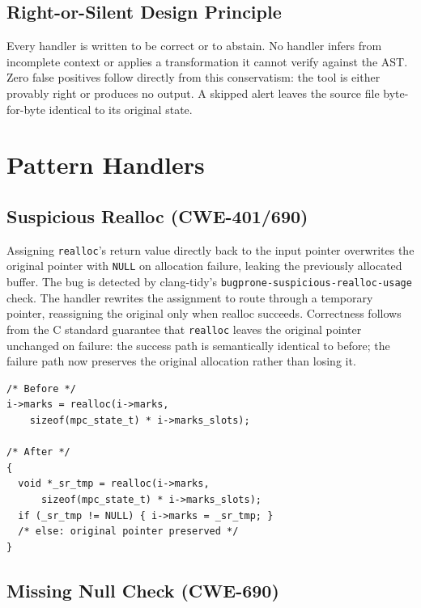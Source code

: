 \documentclass[conference]{IEEEtran}
\begin{document}
\subsection{Right-or-Silent Design Principle}
Every handler is written to be correct or to abstain. No handler infers from
incomplete context or applies a transformation it cannot verify against the AST.
Zero false positives follow directly from this conservatism: the tool is either
provably right or produces no output. A skipped alert leaves the source
file byte-for-byte identical to its original state.


\section{Pattern Handlers}
\label{sec:handlers}

\subsection{Suspicious Realloc (CWE-401/690)}

Assigning \texttt{realloc}'s return value directly back to the input pointer
overwrites the original pointer with \texttt{NULL} on allocation failure, leaking
the previously allocated buffer. The bug is detected by clang-tidy's
\texttt{bugprone-suspicious-realloc-usage} check. The handler rewrites the
assignment to route through a temporary pointer, reassigning the original only
when realloc succeeds. Correctness follows from the C standard guarantee that
\texttt{realloc} leaves the original pointer unchanged on failure: the success
path is semantically identical to before; the failure path now preserves the
original allocation rather than losing it.

\begin{lstlisting}[caption={CWE-401/690 fix: mpc.c (orangeduck/mpc)}]
/* Before */
i->marks = realloc(i->marks,
    sizeof(mpc_state_t) * i->marks_slots);

/* After */
{
  void *_sr_tmp = realloc(i->marks,
      sizeof(mpc_state_t) * i->marks_slots);
  if (_sr_tmp != NULL) { i->marks = _sr_tmp; }
  /* else: original pointer preserved */
}
\end{lstlisting}

\subsection{Missing Null Check (CWE-690)}
\end{document}
